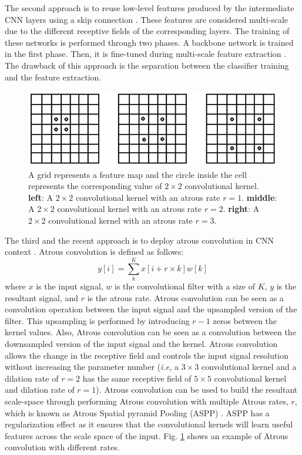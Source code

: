 The second approach is to reuse low-level features produced by the intermediate CNN layers using a skip connection \cite{chen2014semantic}\cite{hariharan2015hypercolumns}. These features are considered multi-scale due to the different receptive fields of the corresponding layers. The training of these networks is performed through two phases. A backbone network is trained in the first phase.  Then, it is fine-tuned during multi-scale feature extraction \cite{long2015fully}\cite{lin2017feature}. The drawback of this approach is the separation between the classifier training and the feature extraction.\\
\begin{center}
    \begin{figure}
    \centerline{\includegraphics[width=\textwidth]{Figures/AtrousConv.PNG}}
    \caption{A grid represents a feature map and the circle inside the cell represents the corresponding value of $2\times 2$ convolutional kernel. \textbf{left}: A $2\times 2$ convolutional kernel with an atrous rate $r=1$. \textbf{middle}: A $2\times 2$ convolutional kernel with an atrous rate $r=2$. \textbf{right}: A $2\times 2$ convolutional kernel with an atrous rate $r=3$.}
    \label{AtrousConv}
    \end{figure}
    \end{center}
The third and the recent approach is to deploy atrous convolution \cite{holschneider1990real} in CNN context \cite{chen2017deeplab}\cite{giusti2013fast}. Atrous convolution is defined as follows: \[y[i]=\sum_{k}^{K} x[i+r\times k] w[k]\] where $x$ is the input signal, $w$ is the convolutional filter with a size of $K$, $y$ is the resultant signal, and $r$ is the atrous rate. Atrous convolution can be seen as a convolution operation between the input signal and the upsampled version of the filter. This upsampling is performed by introducing $r-1$ zeros between the kernel values. Also, Atrous convolution can be seen as a  convolution between the downsampled version of the input signal and the kernel. Atrous convolution allows the change in the receptive field and controls the input signal resolution without increasing the parameter number \cite{chen2017rethinking} (\textit{i.e,} a $3\times 3$ convolutional kernel and a dilation rate of $r=2$ has the same receptive field of $5\times 5$ convolutional kernel and dilation rate of $r=1$). Atrous convolution can be used to build the resultant scale-space through performing Atrous convolution with multiple Atrous rates, $r$, which is known as Atrous Spatial pyramid Pooling (ASPP) \cite{chen2017deeplab}. ASPP has a regularization effect as it ensures that the convolutional kernels will learn useful features across the scale space of the input. Fig. \ref{AtrousConv} shows an example of  Atrous convolution with different rates. 


